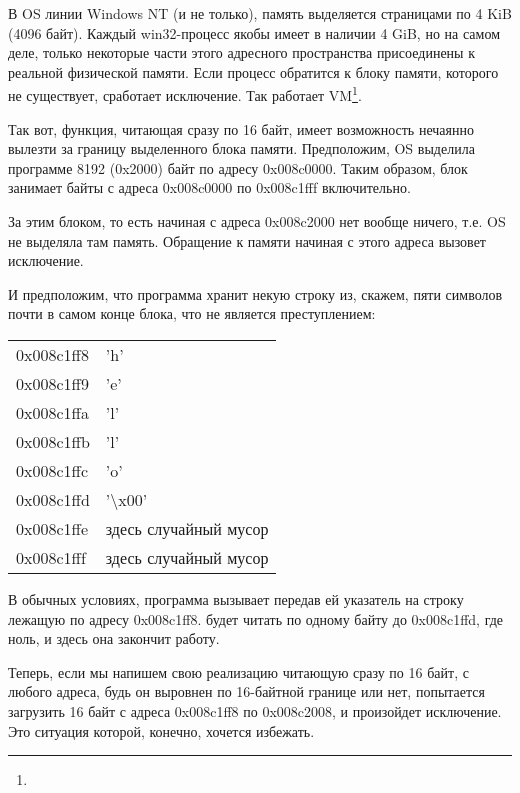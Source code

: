 В \ac{OS} линии \gls{Windows NT} (и не только), память выделяется страницами по 4 KiB (4096 байт). 
Каждый win32-процесс якобы имеет в наличии 4 GiB, но на самом деле, 
только некоторые части этого адресного пространства присоединены к реальной физической памяти. 
Если процесс обратится к блоку памяти, которого не существует, сработает исключение. 
Так работает \ac{VM}\footnote{\URLPAGE}.

Так вот, функция, читающая сразу по 16 байт, имеет возможность нечаянно вылезти за границу 
выделенного блока памяти. 
Предположим, \ac{OS} выделила программе 8192 (0x2000) байт по адресу 0x008c0000. 
Таким образом, блок занимает байты с адреса 0x008c0000 по 0x008c1fff включительно.

За этим блоком, то есть начиная с адреса 0x008c2000 нет вообще ничего, т.е. \ac{OS} не выделяла там память. 
Обращение к памяти начиная с этого адреса вызовет исключение.

И предположим, что программа хранит некую строку из, скажем, пяти символов почти в самом конце блока, 
что не является преступлением:

\begin{center}
  \begin{tabular}{ | l | l | }
    \hline
        0x008c1ff8 & 'h' \\
        0x008c1ff9 & 'e' \\
        0x008c1ffa & 'l' \\
        0x008c1ffb & 'l' \\
        0x008c1ffc & 'o' \\
        0x008c1ffd & '\textbackslash{}x00' \\
        0x008c1ffe & здесь случайный мусор \\
        0x008c1fff & здесь случайный мусор \\
    \hline
  \end{tabular}
\end{center}

В обычных условиях, программа вызывает \strlen передав ей указатель на строку  
лежащую по адресу 0x008c1ff8. 
\strlen будет читать по одному байту до 0x008c1ffd, где ноль, и здесь она закончит работу.

Теперь, если мы напишем свою реализацию \strlen читающую сразу по 16 байт, с любого адреса, 
будь он выровнен по 16-байтной границе или нет, 
\MOVDQU попытается загрузить 16 байт с адреса 0x008c1ff8 по 0x008c2008, и произойдет исключение. 
Это ситуация которой, конечно, хочется избежать.

